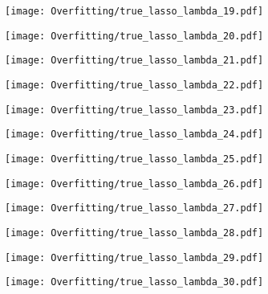 \documentclass[xcolor=pdftex,dvipsnames,table]{beamer}
\begin{document}
\frame
{
	\begin{center}
		\texttt{[image: Overfitting/true\_lasso\_lambda\_19.pdf]}
	\end{center}
}

\frame
{
	\begin{center}
		\texttt{[image: Overfitting/true\_lasso\_lambda\_20.pdf]}
	\end{center}
}

\frame
{
	\begin{center}
		\texttt{[image: Overfitting/true\_lasso\_lambda\_21.pdf]}
	\end{center}
}

\frame
{
	\begin{center}
		\texttt{[image: Overfitting/true\_lasso\_lambda\_22.pdf]}
	\end{center}
}

\frame
{
	\begin{center}
		\texttt{[image: Overfitting/true\_lasso\_lambda\_23.pdf]}
	\end{center}
}

\frame
{
	\begin{center}
		\texttt{[image: Overfitting/true\_lasso\_lambda\_24.pdf]}
	\end{center}
}

\frame
{
	\begin{center}
		\texttt{[image: Overfitting/true\_lasso\_lambda\_25.pdf]}
	\end{center}
}

\frame
{
	\begin{center}
		\texttt{[image: Overfitting/true\_lasso\_lambda\_26.pdf]}
	\end{center}
}

\frame
{
	\begin{center}
		\texttt{[image: Overfitting/true\_lasso\_lambda\_27.pdf]}
	\end{center}
}

\frame
{
	\begin{center}
		\texttt{[image: Overfitting/true\_lasso\_lambda\_28.pdf]}
	\end{center}
}

\frame
{
	\begin{center}
		\texttt{[image: Overfitting/true\_lasso\_lambda\_29.pdf]}
	\end{center}
}

\frame
{
	\begin{center}
		\texttt{[image: Overfitting/true\_lasso\_lambda\_30.pdf]}
	\end{center}
}
\end{document}
